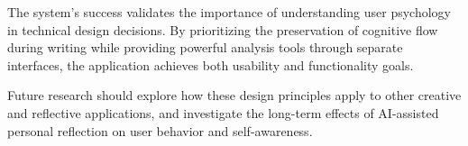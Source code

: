 \documentclass[conference]{IEEEtran}
\begin{document}
The system's success validates the importance of understanding user psychology in technical design decisions. By prioritizing the preservation of cognitive flow during writing while providing powerful analysis tools through separate interfaces, the application achieves both usability and functionality goals.

Future research should explore how these design principles apply to other creative and reflective applications, and investigate the long-term effects of AI-assisted personal reflection on user behavior and self-awareness.


 






\end{document}
